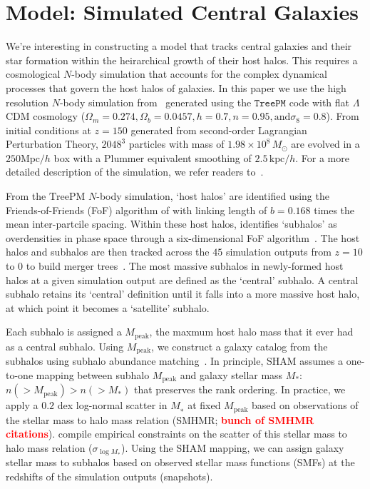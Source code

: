 \documentclass[12pt, letterpaper, preprint]{aastex}
\newcommand{\todo}[1]{{\bf \textcolor{red}{#1}}}
\begin{document}
\section{Model: Simulated Central Galaxies} \label{sec:sim}
We're interesting in constructing a model that tracks central galaxies and 
their star formation within the heirarchical growth of their host halos. This 
requires a cosmological $N$-body simulation that accounts for the complex 
dynamical processes that govern the host halos of galaxies. In this paper 
we use the high resolution $N$-body simulation from~\cite{wetzel2013} generated 
using the \cite{white2002} $\mathtt{TreePM}$ code with flat $\Lambda$CDM cosmology 
($\Omega_m =0.274, \Omega_b = 0.0457, h = 0.7, n=0.95, \mathrm{and} \sigma_8 = 0.8$).
From initial conditions at $z = 150$ generated from second-order Lagrangian 
Perturbation Theory, $2048^3$ particles with mass of $1.98 \times 10^8\,M_\odot$ are 
evolved in a $250 \mathrm{Mpc}/h$ box with a Plummer equivalent smoothing of 
$2.5\,\mathrm{kpc}/h$. For a more detailed description of the simulation, we 
refer readers to~\cite{wetzel2013, wetzel2014}.

From the $\mathrm{TreePM}$ $N$-body simulation, `host halos' are identified 
using the Friends-of-Friends (FoF) algorithm of \cite{davis1985} with 
linking length of $b = 0.168$ times the mean inter-partcile spacing. Within 
these host halos, \cite{wetzel2013} identifies `subhalos' as overdensities 
in phase space through a six-dimensional FoF algorithm~\citep[FoF6D][]{white2010}. 
The host halos and subhalos are then tracked across the $45$ simulation 
outputs from $z = 10$ to $0$ to build merger trees~\citep{wetzel2009,wetzel2010}. 
The most massive subhalos in newly-formed host halos at a given simulation 
output are defined as the `central' subhalo. A central subhalo retains its 
`central' definition until it falls into a more massive host halo, at which 
point it becomes a `satellite' subhalo. 

Each subhalo is assigned a $M_\mathrm{peak}$, the maxmum host halo mass that 
it ever had as a central subhalo. Using $M_\mathrm{peak}$, we construct a galaxy 
catalog from the subhalos using subhalo abundance 
matching~\citep[SHAM;][]{conroy2006,vale2006,yang2009,wetzel2012,leja2013,wetzel2013,wetzel2014,hahn2017a}. 
In principle, SHAM assumes a one-to-one mapping between subhalo 
$M_\mathrm{peak}$ and galaxy stellar mass $M_*$: $n(> M_\mathrm{peak}) > n(> M_*)$
that preserves the rank ordering. In practice, we apply a $0.2$ dex log-normal 
scatter in $M_∗$ at fixed $M_\mathrm{peak}$ based on observations of the stellar 
mass to halo mass relation (SMHMR; \todo{bunch of SMHMR citations}). \cite{gu2016} 
compile empirical constraints on the scatter of this stellar mass to halo 
mass relation ($\sigma_{\log M_*}$). Using the SHAM mapping, we can 
assign galaxy stellar mass to subhalos based on observed stellar mass 
functions (SMFs) at the redshifts of the simulation outputs (snapshots). 
\end{document}
